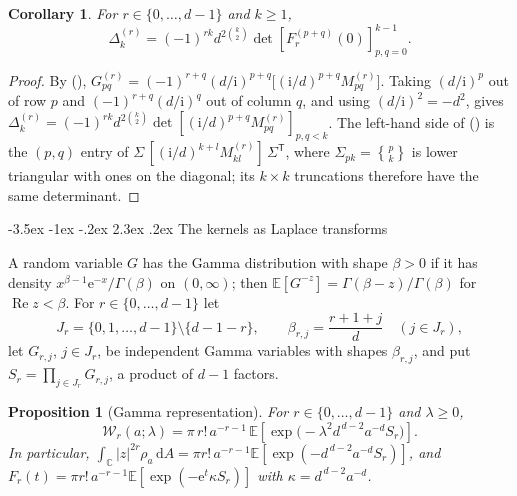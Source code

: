 \documentclass[twoside,10pt]{article}
\makeatletter
\numberwithin{equation}{section}
\theoremstyle{slbody}
\newtheorem{proposition}[theorem]{Proposition}
\newtheorem{corollary}[theorem]{Corollary}
\theoremstyle{remark}
\newcommand{\C}{\mathbb C}
\newcommand{\dd}{\,\mathrm d}
\newcommand{\ii}{\mathrm i}
\newcommand{\e}{\mathrm e}
\newcommand{\stir}[2]{\genfrac\{\}{0pt}{}{#1}{#2}}
\newcommand{\E}{\mathbb E}
\renewcommand{\section}{%
  \@startsection{section}{1}{\z@}%
    {-3.5ex \@plus -1ex \@minus -.2ex}%
    {2.3ex \@plus .2ex}%
    {\normalfont\large\bfseries}}
\renewcommand{\eqref}[1]{%
  \textup{{\normalfont(\oldstylenums{\ref{#1}}}\normalfont)}}
\makeatother
\begin{document}
\begin{corollary}\label{cor:hankel}
For \(r\in\{0,\ldots,d-1\}\) and \(k\geq1\),
\begin{equation}
\Delta_k^{(r)}=(-1)^{rk}d^{2\binom k2}\det\left[F_r^{(p+q)}(0)\right]_{p,q=0}^{k-1}.
\label{eq:Delta-hankel}
\end{equation}
\end{corollary}

\begin{proof}
By \eqref{eq:gram-block},
\(G_{pq}^{(r)}=(-1)^{r+q}(d/\ii)^{p+q}\bigl[(\ii/d)^{p+q}M_{pq}^{(r)}\bigr]\).
Taking \((d/\ii)^p\) out of row \(p\) and \((-1)^{r+q}(d/\ii)^q\) out of
column \(q\), and using \((d/\ii)^2=-d^2\), gives
\(\Delta_k^{(r)}=(-1)^{rk}d^{2\binom k2}\det[(\ii/d)^{p+q}M_{pq}^{(r)}]_{p,q<k}\).
The left-hand side of \eqref{eq:source-moments} is the \((p,q)\) entry
of \(\Sigma\,[(\ii/d)^{k+l}M_{kl}^{(r)}]\,\Sigma^{\mathsf T}\), where
\(\Sigma_{pk}=\stir pk\) is lower triangular with ones on the diagonal;
its \(k\times k\) truncations therefore have the same determinant.
\end{proof}

\section{The kernels as Laplace transforms}\label{sec:gamma}

A random variable \(G\) has the Gamma distribution with shape
\(\beta>0\) if it has density \(x^{\beta-1}\e^{-x}/\Gamma(\beta)\) on
\((0,\infty)\); then \(\E[G^{-z}]=\Gamma(\beta-z)/\Gamma(\beta)\) for
\(\operatorname{Re}z<\beta\).  For \(r\in\{0,\ldots,d-1\}\) let
\[
J_r=\{0,1,\ldots,d-1\}\setminus\{d-1-r\},
\qquad
\beta_{r,j}=\frac{r+1+j}{d}\quad(j\in J_r),
\]
let \(G_{r,j}\), \(j\in J_r\), be independent Gamma variables with
shapes \(\beta_{r,j}\), and put \(S_r=\prod_{j\in J_r}G_{r,j}\), a product
of \(d-1\) factors.

\begin{proposition}[Gamma representation]\label{prop:gamma}
For \(r\in\{0,\ldots,d-1\}\) and \(\lambda\geq0\),
\begin{equation}
\mathcal W_r(a;\lambda)
=\pi\,r!\,a^{-r-1}\,
\E\left[\exp\bigl(-\lambda^2d^{\,d-2}a^{-d}S_r\bigr)\right].
\label{eq:gamma-rep}
\end{equation}
In particular, \(\int_\C|z|^{2r}\rho_a\dd A=\pi r!\,a^{-r-1}
\E[\exp(-d^{\,d-2}a^{-d}S_r)]\), and
\(F_r(t)=\pi r!\,a^{-r-1}\E[\exp(-\e^t\kappa S_r)]\) with
\(\kappa=d^{\,d-2}a^{-d}\).
\end{proposition}
\end{document}
